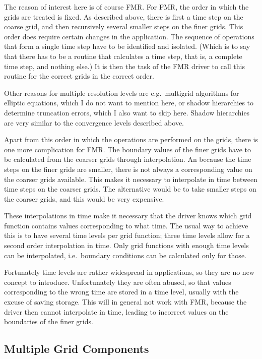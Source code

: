 The reason of interest here is of course FMR.  For FMR, the order in
which the grids are treated is fixed.  As described above, there is
first a time step on the coarse grid, and then recursively several
smaller steps on the finer grids.  This order does require certain
changes in the application.  The sequence of operations that form a
single time step have to be identified and isolated.  (Which is to say
that there has to be a routine that calculates a time step, that is, a
complete time step, and nothing else.)  It is then the task of the FMR
driver to call this routine for the correct grids in the correct
order.

Other reasons for multiple resolution levels are e.g.\ multigrid
algorithms for elliptic equations, which I do not want to mention
here, or shadow hierarchies to determine truncation errors, which I
also want to skip here.  Shadow hierarchies are very similar to the
convergence levels described above.

Apart from this order in which the operations are performed on the
grids, there is one more complication for FMR.  The boundary values of
the finer grids have to be calculated from the coarser grids through
interpolation.  An because the time steps on the finer grids are
smaller, there is not always a corresponding value on the coarser
grids available.  This makes it necessary to interpolate in time
between time steps on the coarser grids.  The alternative would be to
take smaller steps on the coarser grids, and this would be very
expensive.

These interpolations in time make it necessary that the driver knows
which grid function contains values corresponding to what time.  The
usual way to achieve this is to have several time levels per grid
function; three time levels allow for a second order interpolation in
time.  Only grid functions with enough time levels can be
interpolated, i.e.\ boundary conditions can be calculated only for
those.

Fortunately time levels are rather widespread in applications, so they
are no new concept to introduce.  Unfortunately they are often abused,
so that values corresponding to the wrong time are stored in a time
level, usually with the excuse of saving storage.  This will in
general not work with FMR, because the driver then cannot interpolate
in time, leading to incorrect values on the boundaries of the finer
grids.

\subsection{Multiple Grid Components}

